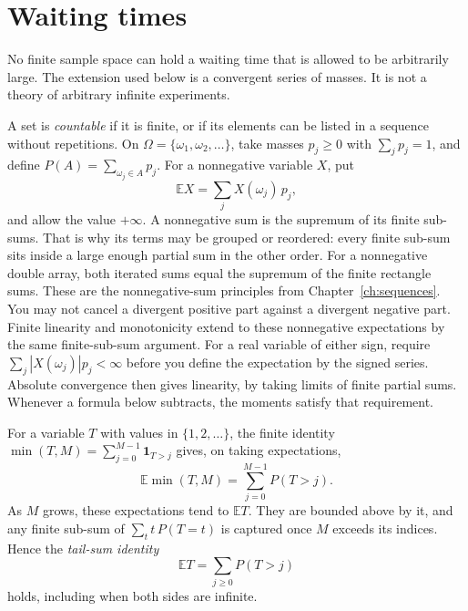 
\section{Waiting times}\label{sec:countable-probability}

No finite sample space can hold a waiting time that is allowed to be arbitrarily large. The extension used below is a convergent series of masses. It is not a theory of arbitrary infinite experiments.

A set is \emph{countable} if it is finite, or if its elements can be listed in a sequence without repetitions. On $\Omega=\{\omega_1,\omega_2,\ldots\}$, take masses $p_j\ge0$ with $\sum_j p_j=1$, and define $P(A)=\sum_{\omega_j\in A}p_j$. For a nonnegative variable $X$, put
\[
 \mathbb EX=\sum_j X(\omega_j)\,p_j,
\]
and allow the value $+\infty$. A nonnegative sum is the supremum of its finite sub-sums. That is why its terms may be grouped or reordered: every finite sub-sum sits inside a large enough partial sum in the other order. For a nonnegative double array, both iterated sums equal the supremum of the finite rectangle sums. These are the nonnegative-sum principles from Chapter~\ref{ch:sequences}. You may not cancel a divergent positive part against a divergent negative part. Finite linearity and monotonicity extend to these nonnegative expectations by the same finite-sub-sum argument. For a real variable of either sign, require $\sum_j |X(\omega_j)|p_j<\infty$ before you define the expectation by the signed series. Absolute convergence then gives linearity, by taking limits of finite partial sums. Whenever a formula below subtracts, the moments satisfy that requirement.

For a variable $T$ with values in $\{1,2,\ldots\}$, the finite identity $\min(T,M)=\sum_{j=0}^{M-1}\mathbf1_{T>j}$ gives, on taking expectations,
\[
 \mathbb E\min(T,M)=\sum_{j=0}^{M-1}P(T>j).
\]
As $M$ grows, these expectations tend to $\mathbb ET$. They are bounded above by it, and any finite sub-sum of $\sum_t t\,P(T=t)$ is captured once $M$ exceeds its indices. Hence the \emph{tail-sum identity}
\begin{equation}
 \mathbb ET=\sum_{j\ge0}P(T>j) \tag{*}
\end{equation}
holds, including when both sides are infinite.

